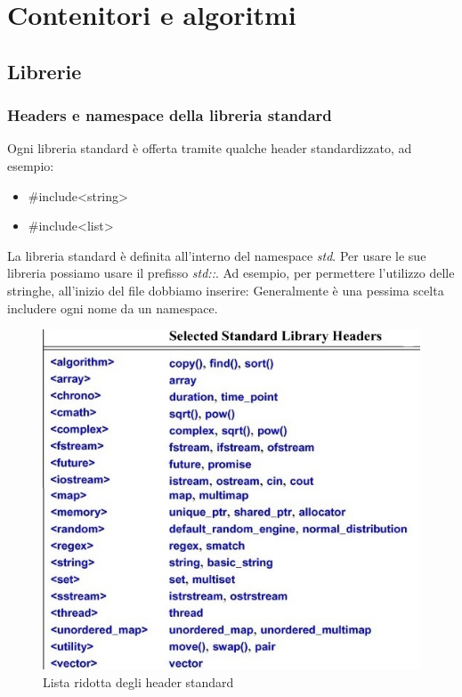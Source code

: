 \documentclass[11pt,a4paper]{book}
\begin{document}
\chapter{Contenitori e algoritmi}
\section{Librerie}
\subsection{Headers e namespace della libreria standard}
Ogni libreria standard è offerta tramite qualche header standardizzato, ad esempio:
\begin{itemize}
	\item \#include<string>
	\item \#include<list>
\end{itemize}
La libreria standard è definita all'interno del namespace \emph{std}. Per usare le sue libreria possiamo usare il prefisso \emph{std::}.
\label{code: 055}
Ad esempio, per permettere l'utilizzo delle stringhe, all'inizio del file dobbiamo inserire:
\label{code: 056}
Generalmente è una pessima scelta includere ogni nome da un namespace.
\begin{figure}[h!]
	\begin{center}
		\includegraphics[scale=0.6]{img/006.jpg}
		\caption{Lista ridotta degli header standard}
		\label{fig: 006}
	\end{center}
\end{figure}
\end{document}

